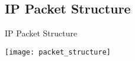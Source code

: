 \begin{landscape}
\chapter{\ac{IP} Packet Structure}
\label{chp:ip_packet}
\begin{table}
\caption{\ac{IP} Packet Structure}
\label{tbl:packet_structure}
\centering
\texttt{[image: packet\_structure]}
\end{table}
\end{landscape}

